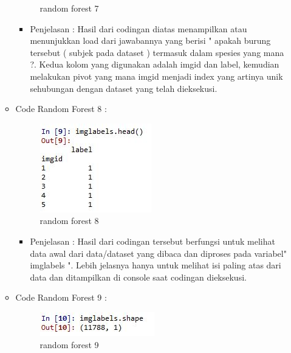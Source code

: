 \begin{enumerate}
\begin{itemize}
\begin{figure}[ht]
\caption{random forest 7}
\label{contoh}
\end{figure}
\par
\begin{itemize}
\item Penjelasan : Hasil dari codingan diatas menampilkan atau menunjukkan load dari  jawabannya yang berisi " apakah burung tersebut ( subjek pada dataset ) termasuk dalam spesies yang mana ?. Kedua kolom yang digunakan adalah imgid dan label, kemudian melakukan pivot yang mana imgid menjadi index yang artinya unik sehubungan dengan dataset yang telah dieksekusi.
\par
\par
\end{itemize}
\item Code Random Forest 8 :
\par
\begin{figure}[ht]
\centering
\includegraphics[scale=0.4]{figures/ran8.jpg}
\caption{random forest 8}
\label{contoh}
\end{figure}
\par
\begin{itemize}
\item Penjelasan : Hasil dari codingan tersebut berfungsi untuk melihat data awal dari data/dataset yang dibaca dan diproses pada variabel"  imglabels ". Lebih jelasnya hanya untuk melihat isi paling atas dari data dan ditampilkan di console saat codingan dieksekusi.
\par
\par
\end{itemize}
\item Code Random Forest 9 :
\par
\begin{figure}[ht]
\centering
\includegraphics[scale=0.2]{figures/ran9.jpg}
\caption{random forest 9}
\label{contoh}
\end{figure}
\par
\begin{itemize}

\end{itemize}
\end{itemize}
\end{enumerate}
